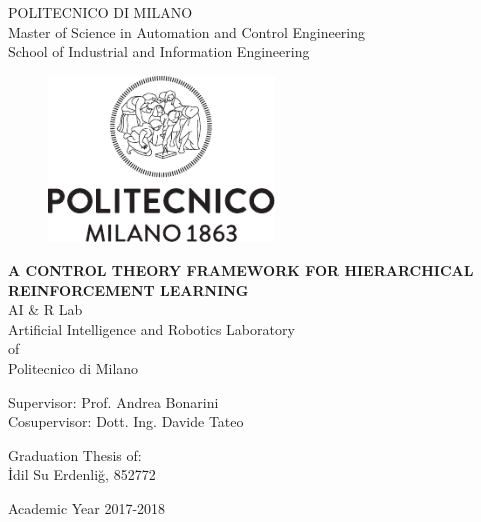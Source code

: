 \thispagestyle{empty}
\vspace*{-1.5cm} \bfseries{
\begin{center}
  \large
  POLITECNICO DI MILANO\\
  \normalsize
  Master of Science in Automation and Control Engineering\\
  School of Industrial and Information Engineering\\
  \vspace*{0.3cm}
  \begin{figure}[htbp]
    \begin{center}
      \includegraphics[width=6cm]{./logo/logoPoliWhite_nome.pdf}
    \end{center}
  \end{figure}
  \vspace*{0.3cm} \LARGE
  \textbf{A CONTROL THEORY FRAMEWORK FOR HIERARCHICAL REINFORCEMENT LEARNING}\\
  \vspace*{.75truecm} \large
  AI \& R Lab \\
  Artificial Intelligence and Robotics Laboratory \\
  of \\
  Politecnico di Milano\\
  \vspace*{1.0cm}
\end{center}
\large
\begin{flushleft}
  Supervisor:  Prof. Andrea Bonarini\\
  Cosupervisor: Dott. Ing. Davide Tateo\\
\end{flushleft}
\vspace*{1.0cm}
\begin{flushright}
  Graduation Thesis of:\\ İdil Su Erdenliğ, 852772 \\ 
\end{flushright}
\vspace*{0.5cm}
\begin{center}
  Academic Year 2017-2018
\end{center} \clearpage
}
